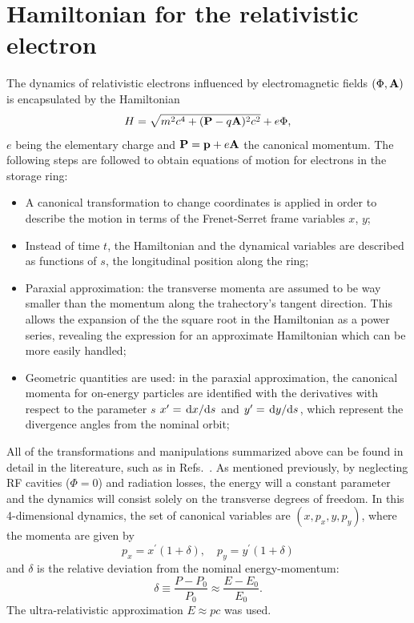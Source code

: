\section{Hamiltonian for the relativistic electron}
The dynamics of relativistic electrons influenced by electromagnetic fields $(\Phi, \vb{A})$ is encapsulated by the Hamiltonian \cite{landau_classical_1975}
    \begin{equation*}
        H=\sqrt{m^2c^4+(\vb{P}-q\vb{A})^2c^2}+e\Phi,
    \end{equation*}
 $e$ being the elementary charge and $\vb{P}=\vb{p}+e\vb{A}$ the canonical momentum. The following steps are followed to obtain equations of motion for electrons in the storage ring:
 \begin{itemize}
    \item A canonical transformation to change coordinates is applied in order to describe the motion in terms of the Frenet-Serret frame variables $x$, $y$;
    \item Instead of time $t$, the Hamiltonian and the dynamical variables are described as functions of $s$, the longitudinal position along the ring;
    \item Paraxial approximation: the transverse momenta are assumed to be way smaller than the momentum along the trahectory's tangent direction. This allows the expansion of the the square root in the Hamiltonian as a power series, revealing the expression for an approximate Hamiltonian which can be more easily handled;
    \item Geometric quantities are used: in the paraxial approximation, the canonical momenta for on-energy particles are identified with the derivatives with respect to the parameter $s$ $x^\prime = \dv*{x}{s}$ and $y^\prime = \dv*{y}{s}$, which represent the divergence angles from the nominal orbit;
 \end{itemize}
 All of the transformations and manipulations summarized above can be found in detail in the litereature, such as in Refs.~\cite{lee_accelerator_2004, wiedemann_particle_2015,  wolski_beam_2014}. As mentioned previously, by neglecting RF cavities ($\Phi=0$) and radiation losses, the energy will a constant parameter and the dynamics will consist solely on the transverse degrees of freedom.  In this 4-dimensional dynamics, the set of canonical variables are $(x,p_{x},y , p_{y})$, where the momenta are given by
\begin{equation} p_{x}= x^\prime(1+\delta),\quad p_{y}=y^\prime (1+\delta)\end{equation}
and $\delta$ is the relative deviation from the nominal energy-momentum:
\begin{equation}
    \delta \equiv \frac{P-P_{0}}{P_{0}}\approx\frac{E-E_0}{E_0}.
\end{equation}
The ultra-relativistic approximation $E\approx pc$ was used.

